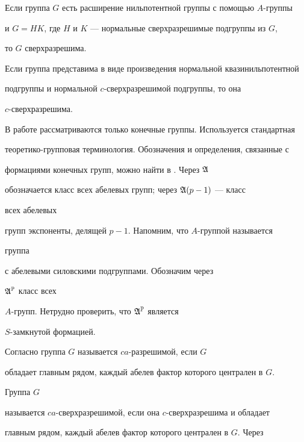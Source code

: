 \begin{cor}


Если группа $G$ есть расширение нильпотентной группы с помощью $A$-группы


и $G=HK$, где $H$ и $K$ --- нормальные сверхразрешимые подгруппы из $G$,


то $G$ сверхразрешима.


\end{cor}





\begin{cor}


Если группа представима в виде произведения нормальной квазинильпотентной


подгруппы и нормальной $c$-сверхразрешимой подгруппы, то она


$c$-сверхразрешима.


\end{cor}





В работе рассматриваются только конечные группы. Используется стандартная


теоретико-групповая терминология. Обозначения и определения, связанные с


формациями конечных групп, можно найти в \cite{She}. Через $\frak A$


обозначается класс всех абелевых групп; через $\frak A(p-1)$ --- класс


всех абелевых


групп экспоненты, делящей $p-1$. Напомним, что $A$-группой называется


группа


с абелевыми силовскими подгруппами. Обозначим через


$\frak A^{\Bbb P}$ класс всех


$A$-групп. Нетрудно проверить, что $\frak A^{\Bbb P}$ является


$S$-замкнутой формацией.


Согласно \cite{Ved} группа $G$ называется $ca$-разрешимой, если $G$


обладает главным рядом, каждый абелев фактор которого централен в $G$.


Группа $G$


называется $ca$-сверхразрешимой, если она $c$-сверхразрешима и обладает


главным рядом, каждый абелев фактор которого централен в $G$. Через


